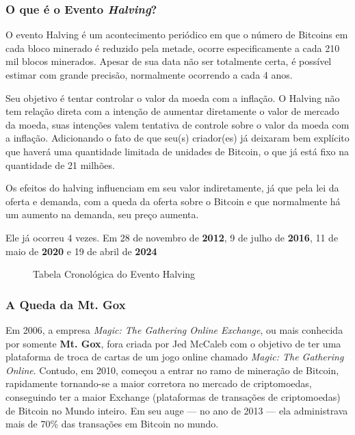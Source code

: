 \subsubsection{\textbf{O que é o Evento \textit{Halving}?}}
O evento Halving é um acontecimento periódico em que o número de Bitcoins em cada bloco minerado é reduzido pela metade, ocorre especificamente a cada 210 mil blocos minerados. Apesar de sua data não ser totalmente certa, é possível estimar com grande precisão, normalmente ocorrendo a cada 4 anos.

Seu objetivo é tentar controlar o valor da moeda com a inflação. O Halving não tem relação direta com a intenção de aumentar diretamente o valor de mercado da moeda, suas intenções valem tentativa de controle sobre o valor da moeda com a inflação. Adicionando o fato de que seu(s) criador(es) já deixaram bem explícito que haverá uma quantidade limitada de unidades de Bitcoin, o que já está fixo na quantidade de 21 milhões.

Os efeitos do halving influenciam em seu valor indiretamente, já que pela lei da oferta e demanda, com a queda da oferta sobre o Bitcoin e que normalmente há um aumento na demanda, seu preço aumenta.

Ele já ocorreu 4 vezes. Em 28 de novembro de \textbf{2012}, 9 de julho de \textbf{2016}, 11 de maio de \textbf{2020}  e 19 de abril de \textbf{2024}

\begin{figure}[h]
    \centering
    \caption{Tabela Cronológica do Evento Halving}
    \label{fig:Tabela Cronologica do Evento Halving}
\end{figure}

\subsubsection{\textbf{A Queda da Mt. Gox}}
Em 2006, a empresa \textit{Magic: The Gathering Online Exchange}, ou mais conhecida por somente \textbf{Mt. Gox}, fora criada por Jed McCaleb com o objetivo de ter uma plataforma de troca de cartas de um jogo online chamado \textit{Magic: The Gathering Online}.  Contudo, em 2010, começou a entrar no ramo de mineração de Bitcoin, rapidamente tornando-se a maior corretora no mercado de criptomoedas, conseguindo ter a maior Exchange (plataformas de transações de criptomoedas) de Bitcoin no Mundo inteiro.  Em seu auge — no ano de 2013 — ela administrava mais de 70\% das transações em Bitcoin no mundo. 

